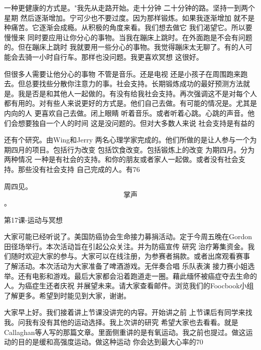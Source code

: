 一种更健康的方式是。"我先从走路开始。走十分钟 二十分钟的路。坚持一到两个星期 然后逐渐增加。宁可少也不要过度。因为那样锻炼。如果我逐渐增加 就不是种痛苦。它逐渐会成瘾。从积极的角度来看。我们想去做它 我们渴望它。所以要慢慢来 同时要应用让你分心的事物。当我在蹦床上跳时。在外面跑是不会有问题的。但在蹦床上跳时 我就要用一些分心的事物。我觉得蹦床太无聊了。有的人可能会去骑一小时自行车。那样也没问题。我更喜欢冥想 这很好。 

但很多人需要让他分心的事物 不管是音乐。还是电视 还是小孩子在周围跑来跑去。但总要找些分散你注意力的事。社会支持。长期锻炼成功的最好预测方法就是。我是否是和其他人一起做的。有没有给我社会支持。再次强调这不是对每个人都有用的。对有些人来说更好的方式是。他们自己去做。有可能的情况是。尤其是内向的人 更喜欢自己去做。闭上眼睛 听着音乐。或者听着心跳。心跳的声音。他们会想要独自一个人的时间 这是没问题的。但对大多数人来说 社会支持是有益的 

还有个研究。由Wing和Jerry 两名心理学家完成的。他们所做的是让人参与一个为期四月的项目。包括行为改变 包括饮食改变。包括锻炼上的改变 为期四月。分为两种情况 一种是有社会的支持。和你的朋友或者家人一起做。或者没有社会支持。那些没有社会支持 自己完成的人。有76%

周四见。\[掌声\]。 

第17课-运动与冥想 

大家可能已经听说了。美国防癌协会生命接力募捐活动。定于今周五晚在Gordon田径场举行。本次活动旨在引起公众关注。并为防癌宣传 研究 治疗筹集资金。我们随时欢迎大家的参与。大家可以在线注册，为参赛者捐款。或者出席观看赛事 了解活动。本次活动为大家准备了啤酒游戏。无伴奏合唱 乐队表演 接力赛小姐选举。还有电影和游戏。最后大家都会沿着跑道走一圈。藉此缅怀被癌症夺去生命的人。为癌症生还者庆祝 并展望未来。请大家查看邮件。浏览我们的Foocbook小组 了解更多。希望到时能见到大家，谢谢。 

大家早上好。我们接着讲上节课没讲完的内容。开始讲之前 上节课后有同学来找我。问我有没有其他的运动选择。我上次讲的研究 希望大家也去看看。就是Callaghan等人写的那篇文章。里面侧重讲的是有氧运动。我之前也提过。做这运动的目的是缓和高强度运动。做这种运动 你会达到最大心率的70%

